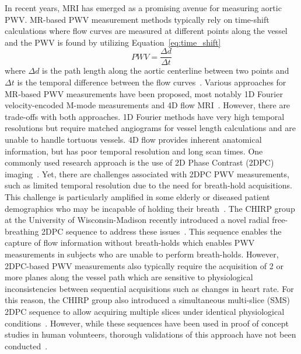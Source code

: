In recent years, MRI has emerged as a promising avenue for measuring aortic PWV\@. MR-based PWV measurement methods typically rely on time-shift calculations where flow curves are measured at different points along the vessel and the PWV is found by utilizing Equation~\ref{eq:time_shift} 
\begin{equation}
    PWV=\frac{\Delta d}{\Delta t}
    \label{eq:time_shift}
\end{equation} 
where $\Delta d$ is the path length along the aortic centerline between two points and $\Delta t$ is the temporal difference between the flow curves~\cite{wentlandReviewMRIbasedMeasurements2014}. Various approaches for MR-based PWV measurements have been proposed, most notably 1D Fourier velocity-encoded M-mode measurements and 4D flow MRI~\cite{tavianiAccuracyRepeatabilityFourier2010,wentlandAorticPulseWave2013}\@. However, there are trade-offs with both approaches. 1D Fourier methods have very high temporal resolutions but require matched angiograms for vessel length calculations and are unable to handle tortuous vessels. 4D flow provides inherent anatomical information, but has poor temporal resolution and long scan times. One commonly used research approach is the use of 2D Phase Contrast (2DPC) imaging~\cite{wentlandCineFlowMeasurements2006,tavianiAccuracyRepeatabilityFourier2010}. Yet, there are challenges associated with 2DPC PWV measurements, such as limited temporal resolution due to the need for breath-hold acquisitions. This challenge is particularly amplified in some elderly or diseased patient demographics who may be incapable of holding their breath~\cite{dorniakRequiredTemporalResolution2016}. The CHIRP group at the University of Wisconsin-Madison recently introduced a novel radial free-breathing 2DPC sequence to address these issues~\cite{robertsAdvancingFunctionalAssessment2023}. This sequence enables the capture of flow information without breath-holds which enables PWV measurements in subjects who are unable to perform breath-holds. However, 2DPC-based PWV measurements also typically require the acquisition of 2 or more planes along the vessel path which are sensitive to physiological inconsistencies between sequential acquisitions such as changes in heart rate. For this reason, the CHIRP group also introduced a simultaneous multi-slice (SMS) 2DPC sequence to allow acquiring multiple slices under identical physiological conditions~\cite{robertsAdvancingFunctionalAssessment2023}. However, while these sequences have been used in proof of concept studies in human volunteers, thorough validations of this approach have not been conducted~\cite{narenFeasibility,narenQuantifyingDifferences, narenAorticPWVValsalva, narenComparingRobustnessRespiratoryresolved2024, robertsEffectsRespirationAortic}.

